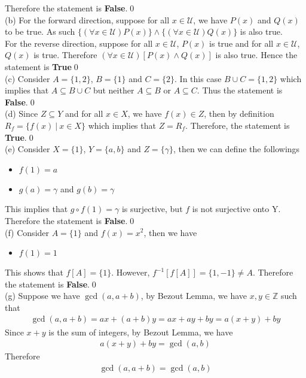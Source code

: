 \documentclass[12pt]{article}
\newcommand{\U}{\mathcal{U}}
\newcommand{\Z}{\mathbb{Z}}
\begin{document}
    Therefore the statement is \textbf{False}.\qed\\[2em]
    (b) For the forward direction, suppose for all $x\in \U$, we have $P(x)$ and $Q(x)$ to be true. As such $\{(\forall x\in\mathcal{U})P(x)\}\land\{(\forall x\in\U) Q(x)\}$ is also true.\\
    For the reverse direction, suppose for all $x\in\U$, $P(x)$ is true and for all $x\in\U$, $Q(x)$ is true. Therefore $(\forall x\in\mathcal{U})[P(x)\land Q(x)]$ is also true. Hence the statement is \textbf{True}\qed\\[2em]
    (c) Consider $A=\{1,2\}$, $B=\{1\}$ and $C=\{2\}$. In this case $B\cup C=\{1,2\}$ which implies that $A\subseteq B\cup C$ but neither $A\subseteq B$ or $A\subseteq C$. Thus the statement is \textbf{False}.\qed\\[2em]
    (d) Since $Z\subseteq Y$ and for all $x\in X$, we have $f(x)\in Z$, then by definition $R_f=\{f(x)\ |\ x\in X\}$ which implies that $Z=R_f$. Therefore, the statement is \textbf{True}.\qed\\[2em]
    (e) Consider $X=\{1\}$, $Y=\{a,b\}$ and $Z=\{\gamma\}$, then we can define the followings
    \begin{itemize}
        \item $f(1)=a$
        \item $g(a)=\gamma$ and $g(b)=\gamma$
    \end{itemize}
    This implies that $g\circ f(1)=\gamma$ is surjective, but $f$ is not surjective onto Y. Therefore the statement is \textbf{False}.\qed\\[2em]
    (f) Consider $A=\{1\}$ and $f(x)=x^2$, then we have
    \begin{itemize}
        \item $f(1)=1$
    \end{itemize}
    This shows that $f[A]=\{1\}$. However, $f^{-1}[f[A]]=\{1,-1\}\neq A$. Therefore the statement is \textbf{False}.\qed\\[2em]
    (g) Suppose we have $\gcd(a,a+b)$, by Bezout Lemma, we have $x,y\in\Z$ such that
    \begin{align*}
        \gcd(a,a+b)=ax+(a+b)y=ax+ay+by=a(x+y)+by
    \end{align*}
    Since $x+y$ is the sum of integers, by Bezout Lemma, we have
    \begin{align*}
        a(x+y)+by=\gcd(a,b)
    \end{align*}
    Therefore 
    \begin{align*}
        \gcd(a,a+b)=\gcd(a,b)
    \end{align*}
\end{document}

